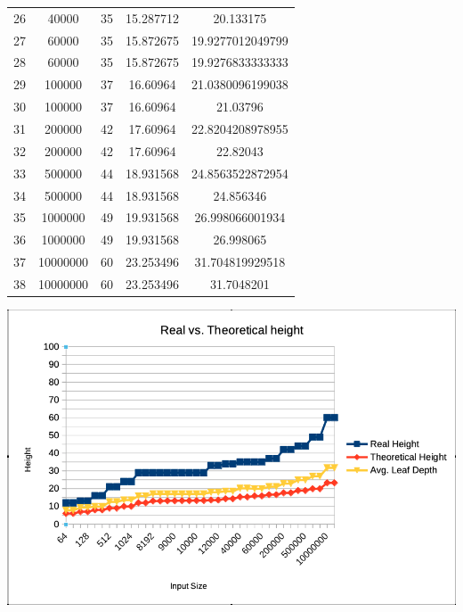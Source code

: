 \documentclass[12pt, a4paper]{article}
\begin{document}
\begin{table}[H]
\begin{tabular}{ |c|c|c|c|c| }
      26 & 40000 & 35 & 15.287712 & 20.133175 \\
      27 & 60000 & 35 & 15.872675 & 19.9277012049799 \\
      28 & 60000 & 35 & 15.872675 & 19.9276833333333 \\
      29 & 100000 & 37 & 16.60964 & 21.0380096199038 \\
      30 & 100000 & 37 & 16.60964 & 21.03796 \\
      31 & 200000 & 42 & 17.60964 & 22.8204208978955 \\
      32 & 200000 & 42 & 17.60964 & 22.82043 \\
      33 & 500000 & 44 & 18.931568 & 24.8563522872954 \\
      34 & 500000 & 44 & 18.931568 & 24.856346 \\
      35 & 1000000 & 49 & 19.931568 & 26.998066001934 \\
      36 & 1000000 & 49 & 19.931568 & 26.998065 \\
      37 & 10000000 & 60 & 23.253496 & 31.704819929518 \\
      38 & 10000000 & 60 & 23.253496 & 31.7048201 \\
      \hline
    \end{tabular}
    \label{table:experiments_results}
  \end{table}



  \begin{minipage}[t]{\linewidth}
    \includegraphics[width=\textwidth]{results}
    \label{fig:graph_result}
  \end{minipage}
\end{document}
